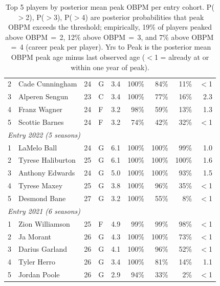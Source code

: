 \begin{table}[htbp]
\begin{tabular}{rlrlrrrrr}
    2 & Cade Cunningham & 24 & G & 3.4 & 100\% & 84\% & 11\% & $<$1 \\
    3 & Alperen Sengun & 23 & C & 3.4 & 100\% & 77\% & 16\% & 2.3 \\
    4 & Franz Wagner & 24 & F & 3.2 & 98\% & 59\% & 13\% & 1.3 \\
    5 & Scottie Barnes & 24 & F & 3.2 & 74\% & 42\% & 32\% & $<$1 \\
    \midrule[0.4pt]
    \multicolumn{9}{l}{\textit{Entry 2022 (5 seasons)}} \\
    \midrule
    1 & LaMelo Ball & 24 & G & 6.1 & 100\% & 100\% & 99\% & 1.0 \\
    2 & Tyrese Haliburton & 25 & G & 6.1 & 100\% & 100\% & 100\% & 1.6 \\
    3 & Anthony Edwards & 24 & G & 5.0 & 100\% & 100\% & 93\% & 1.5 \\
    4 & Tyrese Maxey & 25 & G & 3.8 & 100\% & 96\% & 35\% & $<$1 \\
    5 & Desmond Bane & 27 & G & 3.2 & 100\% & 55\% & 8\% & $<$1 \\
    \midrule[0.4pt]
    \multicolumn{9}{l}{\textit{Entry 2021 (6 seasons)}} \\
    \midrule
    1 & Zion Williamson & 25 & F & 4.9 & 99\% & 99\% & 98\% & $<$1 \\
    2 & Ja Morant & 26 & G & 4.3 & 100\% & 100\% & 73\% & $<$1 \\
    3 & Darius Garland & 26 & G & 4.1 & 100\% & 96\% & 52\% & $<$1 \\
    4 & Tyler Herro & 26 & G & 3.4 & 100\% & 81\% & 14\% & 1.1 \\
    5 & Jordan Poole & 26 & G & 2.9 & 94\% & 33\% & 2\% & $<$1 \\
    \bottomrule
  \end{tabular}
  \caption{Top 5 players by posterior mean peak OBPM per entry cohort. P($>$2), P($>$3), P($>$4) are posterior probabilities that peak OBPM exceeds the threshold; empirically, 19\% of players peaked above OBPM\,$=$\,2, 12\% above OBPM\,$=$\,3, and 7\% above OBPM\,$=$\,4 (career peak per player). Yrs to Peak is the posterior mean OBPM peak age minus last observed age ($<$1 = already at or within one year of peak).}
  \label{tab:breakout_cohort}
\end{table}

